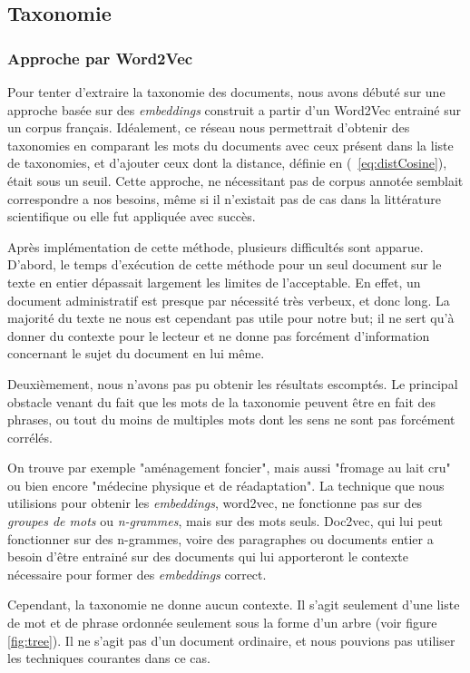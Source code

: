 
\subsection{Taxonomie}%
\subsubsection{Approche par Word2Vec}
Pour tenter d'extraire la taxonomie des documents, nous avons débuté sur une approche basée sur des \textit{embeddings} construit a partir d'un Word2Vec entrainé sur un corpus français. Idéalement, ce réseau nous permettrait d'obtenir des taxonomies en comparant les mots du documents avec ceux présent dans la liste de taxonomies, et d'ajouter ceux dont la distance, définie en (~\ref{eq:distCosine}), était sous un seuil. Cette approche, ne nécessitant pas de corpus annotée semblait correspondre a nos besoins, même si il n'existait pas de cas dans la littérature scientifique ou elle fut appliquée avec succès. %

Après implémentation de cette méthode, plusieurs difficultés sont apparue.
D'abord, le temps d'exécution de cette méthode pour un seul document sur le texte en entier dépassait largement les limites de l'acceptable.
En effet, un document administratif est presque par nécessité très verbeux, et donc long. La majorité du texte ne nous est cependant pas utile pour notre but; 
il ne sert qu'à donner du contexte pour le lecteur et ne donne pas forcément d'information concernant le sujet du document en lui même. 

Deuxièmement, nous n'avons pas pu obtenir les résultats escomptés. Le principal obstacle venant du fait que les mots de la taxonomie peuvent être en fait des phrases, ou tout du moins de multiples mots dont les sens ne sont pas forcément corrélés.

On trouve par exemple "aménagement foncier", mais aussi "fromage au lait cru" ou bien encore "médecine physique et de réadaptation". La technique que nous utilisions pour obtenir les \textit{embeddings}, word2vec, ne fonctionne pas sur des \textit{groupes de mots} ou \textit{n-grammes}, mais sur des mots seuls. Doc2vec, qui lui peut fonctionner sur des n-grammes, voire des paragraphes ou documents entier a besoin d'être entrainé sur des documents qui lui apporteront le contexte nécessaire pour former des \textit{embeddings} correct.

Cependant, la taxonomie ne donne aucun contexte. Il s'agit seulement d'une liste de mot et de phrase ordonnée seulement sous la forme d'un arbre (voir figure \ref{fig:tree}). Il ne s'agit pas d'un document ordinaire, et nous pouvions pas utiliser les techniques courantes dans ce cas. 

